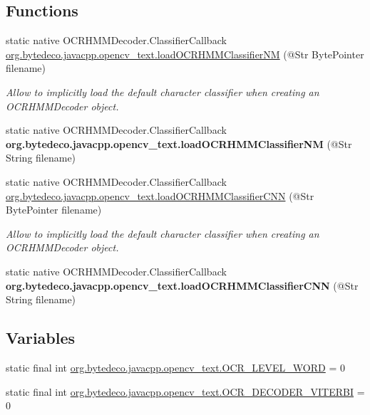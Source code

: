 \subsection*{Functions}
\begin{DoxyCompactItemize}
\item 
static native O\+C\+R\+H\+M\+M\+Decoder.\+Classifier\+Callback \hyperlink{group__text__recognize_gabe00747d37f40a190b2970f14cdc4d60}{org.\+bytedeco.\+javacpp.\+opencv\+\_\+text.\+load\+O\+C\+R\+H\+M\+M\+Classifier\+NM} (@Str Byte\+Pointer filename)
\begin{DoxyCompactList}\small\item\em Allow to implicitly load the default character classifier when creating an O\+C\+R\+H\+M\+M\+Decoder object. \end{DoxyCompactList}\item 
\mbox{\label{group__text__recognize_gaa550264291f57c7f031e1c4cb156d308}} 
static native O\+C\+R\+H\+M\+M\+Decoder.\+Classifier\+Callback {\bfseries org.\+bytedeco.\+javacpp.\+opencv\+\_\+text.\+load\+O\+C\+R\+H\+M\+M\+Classifier\+NM} (@Str String filename)
\item 
static native O\+C\+R\+H\+M\+M\+Decoder.\+Classifier\+Callback \hyperlink{group__text__recognize_ga03f0450934c0f48a89daa868f8ca9fcf}{org.\+bytedeco.\+javacpp.\+opencv\+\_\+text.\+load\+O\+C\+R\+H\+M\+M\+Classifier\+C\+NN} (@Str Byte\+Pointer filename)
\begin{DoxyCompactList}\small\item\em Allow to implicitly load the default character classifier when creating an O\+C\+R\+H\+M\+M\+Decoder object. \end{DoxyCompactList}\item 
\mbox{\label{group__text__recognize_gadadad4c83653ff45f927634f91f9393e}} 
static native O\+C\+R\+H\+M\+M\+Decoder.\+Classifier\+Callback {\bfseries org.\+bytedeco.\+javacpp.\+opencv\+\_\+text.\+load\+O\+C\+R\+H\+M\+M\+Classifier\+C\+NN} (@Str String filename)
\end{DoxyCompactItemize}
\subsection*{Variables}
\begin{DoxyCompactItemize}
\item 
static final int \hyperlink{group__text__recognize_gac4148e33328b79dbead3c33dac186540}{org.\+bytedeco.\+javacpp.\+opencv\+\_\+text.\+O\+C\+R\+\_\+\+L\+E\+V\+E\+L\+\_\+\+W\+O\+RD} = 0
\item 
static final int \hyperlink{group__text__recognize_gac1843f0d2e0e7136debaa46d45446b11}{org.\+bytedeco.\+javacpp.\+opencv\+\_\+text.\+O\+C\+R\+\_\+\+D\+E\+C\+O\+D\+E\+R\+\_\+\+V\+I\+T\+E\+R\+BI} = 0
\end{DoxyCompactItemize}


